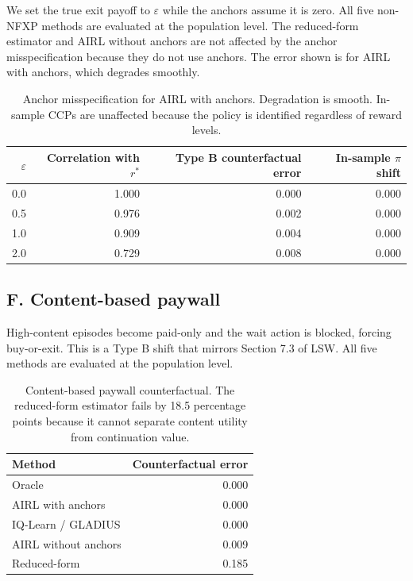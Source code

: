 \documentclass[11pt]{article}
\begin{document}
We set the true exit payoff to $\varepsilon$ while the anchors assume it is zero. All five non-NFXP methods are evaluated at the population level. The reduced-form estimator and AIRL without anchors are not affected by the anchor misspecification because they do not use anchors. The error shown is for AIRL with anchors, which degrades smoothly.

\begin{table}[H]
\centering
\begin{tabular}{rrrr}
\toprule
$\varepsilon$ & Correlation with $r^*$ & Type B counterfactual error & In-sample $\pi$ shift \\
\midrule
0.0 & 1.000 & 0.000 & 0.000 \\
0.5 & 0.976 & 0.002 & 0.000 \\
1.0 & 0.909 & 0.004 & 0.000 \\
2.0 & 0.729 & 0.008 & 0.000 \\
\bottomrule
\end{tabular}
\caption{Anchor misspecification for AIRL with anchors. Degradation is smooth. In-sample CCPs are unaffected because the policy is identified regardless of reward levels.}
\label{tab:misspec}
\end{table}

\subsection{F. Content-based paywall}

High-content episodes become paid-only and the wait action is blocked, forcing buy-or-exit. This is a Type B shift that mirrors Section 7.3 of LSW. All five methods are evaluated at the population level.

\begin{table}[H]
\centering
\begin{tabular}{lr}
\toprule
Method & Counterfactual error \\
\midrule
Oracle & 0.000 \\
AIRL with anchors & 0.000 \\
IQ-Learn / GLADIUS & 0.000 \\
AIRL without anchors & 0.009 \\
Reduced-form & 0.185 \\
\bottomrule
\end{tabular}
\caption{Content-based paywall counterfactual. The reduced-form estimator fails by 18.5 percentage points because it cannot separate content utility from continuation value.}
\label{tab:paywall}
\end{table}
\end{document}
